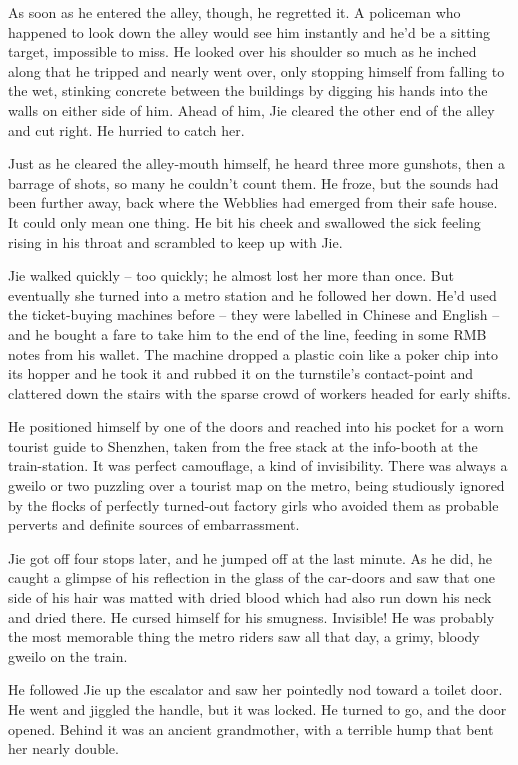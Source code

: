 As soon as he entered the alley, though, he regretted it. A
policeman who happened to look down the alley would see him
instantly and he'd be a sitting target, impossible to miss. He
looked over his shoulder so much as he inched along that he tripped
and nearly went over, only stopping himself from falling to the
wet, stinking concrete between the buildings by digging his hands
into the walls on either side of him. Ahead of him, Jie cleared the
other end of the alley and cut right. He hurried to catch her.

Just as he cleared the alley-mouth himself, he heard three more
gunshots, then a barrage of shots, so many he couldn't count them.
He froze, but the sounds had been further away, back where the
Webblies had emerged from their safe house. It could only mean one
thing. He bit his cheek and swallowed the sick feeling rising in
his throat and scrambled to keep up with Jie.

Jie walked quickly -- too quickly; he almost lost her more than
once. But eventually she turned into a metro station and he
followed her down. He'd used the ticket-buying machines before --
they were labelled in Chinese and English -- and he bought a fare
to take him to the end of the line, feeding in some RMB notes from
his wallet. The machine dropped a plastic coin like a poker chip
into its hopper and he took it and rubbed it on the turnstile's
contact-point and clattered down the stairs with the sparse crowd
of workers headed for early shifts.

He positioned himself by one of the doors and reached into his
pocket for a worn tourist guide to Shenzhen, taken from the free
stack at the info-booth at the train-station. It was perfect
camouflage, a kind of invisibility. There was always a gweilo or
two puzzling over a tourist map on the metro, being studiously
ignored by the flocks of perfectly turned-out factory girls who
avoided them as probable perverts and definite sources of
embarrassment.

Jie got off four stops later, and he jumped off at the last minute.
As he did, he caught a glimpse of his reflection in the glass of
the car-doors and saw that one side of his hair was matted with
dried blood which had also run down his neck and dried there. He
cursed himself for his smugness. Invisible! He was probably the
most memorable thing the metro riders saw all that day, a grimy,
bloody gweilo on the train.

He followed Jie up the escalator and saw her pointedly nod toward a
toilet door. He went and jiggled the handle, but it was locked. He
turned to go, and the door opened. Behind it was an ancient
grandmother, with a terrible hump that bent her nearly double.

